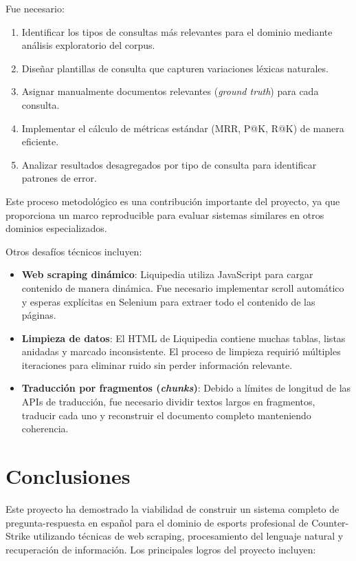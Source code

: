 Fue necesario:
\begin{enumerate}
    \item Identificar los tipos de consultas más relevantes para el dominio mediante análisis exploratorio del corpus.
    \item Diseñar plantillas de consulta que capturen variaciones léxicas naturales.
    \item Asignar manualmente documentos relevantes (\textit{ground truth}) para cada consulta.
    \item Implementar el cálculo de métricas estándar (MRR, P@K, R@K) de manera eficiente.
    \item Analizar resultados desagregados por tipo de consulta para identificar patrones de error.
\end{enumerate}

Este proceso metodológico es una contribución importante del proyecto, ya que proporciona un marco reproducible para evaluar sistemas similares en otros dominios especializados.

Otros desafíos técnicos incluyen:
\begin{itemize}
    \item \textbf{Web scraping dinámico}: Liquipedia utiliza JavaScript para cargar contenido de manera dinámica. Fue necesario implementar scroll automático y esperas explícitas en Selenium para extraer todo el contenido de las páginas.
    \item \textbf{Limpieza de datos}: El HTML de Liquipedia contiene muchas tablas, listas anidadas y marcado inconsistente. El proceso de limpieza requirió múltiples iteraciones para eliminar ruido sin perder información relevante.
    \item \textbf{Traducción por fragmentos (\textit{chunks})}: Debido a límites de longitud de las APIs de traducción, fue necesario dividir textos largos en fragmentos, traducir cada uno y reconstruir el documento completo manteniendo coherencia.
\end{itemize}

\section{Conclusiones}

Este proyecto ha demostrado la viabilidad de construir un sistema completo de pregunta-respuesta en español para el dominio de esports profesional de Counter-Strike utilizando técnicas de web scraping, procesamiento del lenguaje natural y recuperación de información. Los principales logros del proyecto incluyen:


